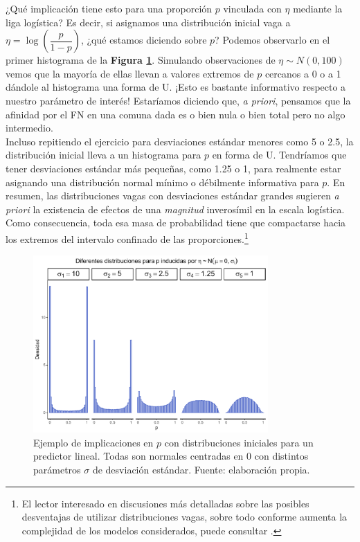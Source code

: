 ¿Qué implicación tiene esto para una proporción $p$ vinculada con $\eta$ mediante la liga logística? Es decir, si asignamos una distribución inicial vaga a $\eta=\log\left(\dfrac{p}{1-p}\right)$, ¿qué estamos diciendo sobre $p$? Podemos observarlo en el primer histograma de la \textbf{Figura \ref{fig:Malas_Iniciales}}. Simulando observaciones de $\eta\sim N(0,100)$ vemos que la mayoría de ellas llevan a valores extremos de $p$ cercanos a 0 o a 1 dándole al histograma una forma de U. ¡Esto es bastante informativo respecto a nuestro parámetro de interés! Estaríamos diciendo que, \textit{a priori}, pensamos que la afinidad por el FN en una comuna dada es o bien nula o bien total pero no algo intermedio.\\ 

Incluso repitiendo el ejercicio para desviaciones estándar menores como 5 o 2.5, la distribución inicial lleva a un histograma para $p$ en forma de U. Tendríamos que tener desviaciones estándar más pequeñas, como 1.25 o 1, para realmente estar asignando una distribución normal mínimo o débilmente informativa para $p$. En resumen, las distribuciones vagas con desviaciones estándar grandes sugieren \textit{a priori} la existencia de efectos de una \textit{magnitud} inverosímil en la escala logística. Como consecuencia, toda esa masa de probabilidad tiene que compactarse hacia los extremos del intervalo confinado de las proporciones.\footnote{El lector interesado en discusiones más detalladas sobre las posibles desventajas de utilizar distribuciones vagas, sobre todo conforme aumenta la complejidad de los modelos considerados, puede consultar \textcites{PriorLikelihood17}{BetancourtStanShapePriors}{BlogSimpson}.}\\ 

\begin{figure}[h]
	\centering
	\includegraphics[width = 0.8\textwidth]{Figs/Modelado/Malas_Iniciales}
	\caption{Ejemplo de implicaciones en $p$ con distribuciones iniciales para un predictor lineal. Todas son normales centradas en $0$ con distintos parámetros $\sigma$ de desviación estándar. Fuente: elaboración propia.}
	\label{fig:Malas_Iniciales}
\end{figure}

